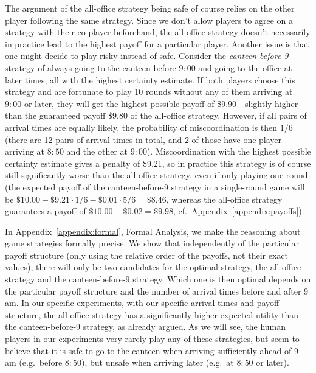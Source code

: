 The argument of the all-office strategy being safe of course relies on the other player following the same strategy. Since we don't allow players to agree on a strategy with their co-player beforehand, the all-office strategy doesn't necessarily in practice lead to the highest payoff for a particular player. Another issue is that one might decide to play risky instead of safe. Consider the \emph{canteen-before-9} strategy of always going to the canteen before $9{:}00$ and going to the office at later times, all with the highest certainty estimate. If both players choose this strategy and are fortunate to play 10 rounds without any of them arriving  at $9{:}00$ or later, they will get the highest possible payoff of \$9.90---slightly higher than the guaranteed payoff \$9.80 of the all-office strategy. However, if all pairs of arrival times are equally likely, the probability of miscoordination is then $1/6$ (there are 12 pairs of arrival times in total, and 2 of those have one player arriving at $8{:}50$ and the other at $9{:}00$). Miscoordination with the highest possible certainty estimate gives a penalty of \$9.21, so in practice this strategy is of course still significantly worse than the all-office strategy, even if only playing one round (the expected payoff of the canteen-before-9 strategy in a single-round game will be $\$10.00 - \$9.21\cdot 1/6 - \$0.01\cdot 5/6 = \$8.46$, whereas the all-office strategy guarantees a payoff of $\$10.00-\$0.02 = \$9.98$, cf.\ Appendix~\ref{appendix:payoffs}).

In Appendix~\ref{appendix:formal}, Formal Analysis, 
we make the reasoning about game strategies formally precise. We show that independently of the particular payoff structure (only using the relative order of the payoffs, not their exact values), there will only be two candidates for the optimal strategy, the all-office strategy and the canteen-before-9 strategy. Which one is then optimal depends on the particular payoff structure and the number of arrival times before and after 9 am. In our specific experiments, with our specific arrival times and payoff structure, the all-office strategy has a significantly higher expected utility than the canteen-before-9 strategy, as already argued. As we will see, the human players in our experiments very rarely play any of these strategies, but seem to believe that it is safe to go to the canteen 
when arriving sufficiently ahead of 9 am (e.g.\ before $8{:}50$), but unsafe when arriving later (e.g.\ at $8{:}50$ or later).

